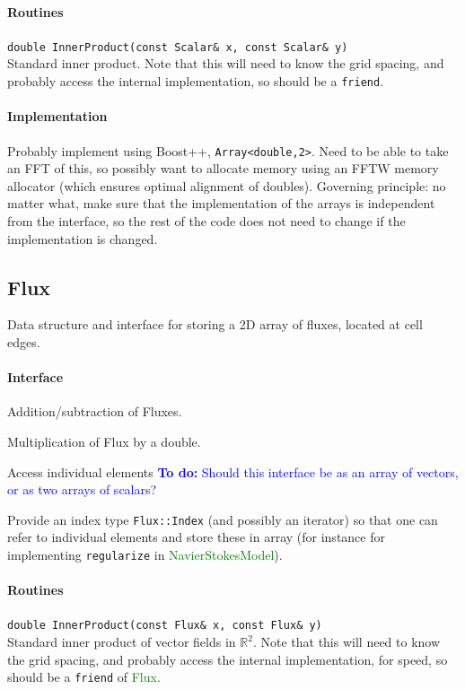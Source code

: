 \documentclass[11pt]{article}
\def\todo#1{\textcolor{blue}{{\bf To do:} #1}}
\def\class#1{\textcolor{green}{\ttfamily\small #1}} %
\let\code\lstinline
\begin{document}
\paragraph{Routines}
\begin{description}
	\item \code|double InnerProduct(const Scalar& x, const Scalar& y)|\\
	Standard inner product.  Note that this will need to know the grid spacing, and probably access the internal implementation, so should be a \code|friend|.
\end{description}

\paragraph{Implementation}
Probably implement using Boost++, \code|Array<double,2>|.  Need to be able to take an FFT of this, so possibly want to allocate memory using an FFTW memory allocator (which ensures optimal alignment of doubles).  Governing principle: no matter what, make sure that the implementation of the arrays is independent from the interface, so the rest of the code does not need to change if the implementation is changed.

\subsection{Flux}
Data structure and interface for storing a 2D array of fluxes, located at cell edges.

\paragraph{Interface}
\begin{description}
	\item Addition/subtraction of Fluxes.
	\item Multiplication of Flux by a double.
	\item Access individual elements \todo{Should this interface be as an array of vectors, or as two arrays of scalars?}
	\item Provide an index type \code|Flux::Index| (and possibly an iterator) so that one can refer to individual elements and store these in array (for instance for implementing \code|regularize| in \class{NavierStokesModel}).
\end{description}

\paragraph{Routines}
\begin{description}
	\item \code|double InnerProduct(const Flux& x, const Flux& y)|\\
	Standard inner product of vector fields in $\mathbb{R}^2$.  Note that this will need to know the grid spacing, and probably access the internal implementation, for speed, so should be a \code|friend| of \class{Flux}.
\end{description}
\end{document}
